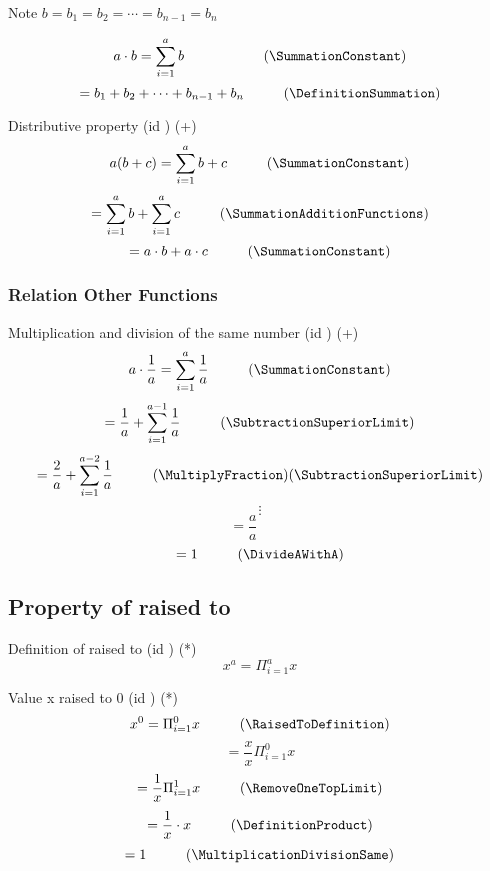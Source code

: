 \documentclass{book}
\begin{document}
                Note $b = b_1 = b_2 = \cdots = b_{n - 1} = b_n$
                
                \[a \cdot b = \sum^a_{i=1}b \hspace{1cm} \hspace{1cm} (\SummationConstant)\]
                \[= b_1 + b_2 + \cdots + b_{n - 1} + b_n \hspace{1cm} (\DefinitionSummation)\]

                Distributive property (id \DistributiveProperty) (+)
                \[a(b + c) = \sum^a_{i=1} b + c \hspace{1cm} (\SummationConstant)\]
                \[= \sum^a_{i=1} b + \sum^a_{i=1} c \hspace{1cm} (\SummationAdditionFunctions)\]
                \[= a \cdot b + a \cdot c \hspace{1cm} (\SummationConstant)\]

                \subsubsection{Relation Other Functions}
                Multiplication and division of the same number (id \MultiplicationDivisionSame) (+)
                \[a \cdot \frac{1}{a} = \sum^a_{i=1} \frac{1}{a} \hspace{1cm} (\SummationConstant)\]
                \[= \frac{1}{a} + \sum^{a - 1}_{i=1} \frac{1}{a} \hspace{1cm} (\SubtractionSuperiorLimit)\]
                \[= \frac{2}{a} + \sum^{a - 2}_{i=1} \frac{1}{a} \hspace{1cm} (\MultiplyFraction)(\SubtractionSuperiorLimit)\]
                \[\vdots\]
                \[= \frac{a}{a} \hspace{1cm}\]
                \[= 1 \hspace{1cm} (\DivideAWithA)\]

            \subsection{Property of raised to}
                Definition of raised to (id \RaisedToDefinition) (*)
                \[x^a = \Pi^a_{i = 1}x\]

                Value x raised to 0 (id \ValueXRaisedToZero) (*)
                \[x^0 = \Pi^0_{i = 1}x \hspace{1cm} (\RaisedToDefinition)\]
                \[= \frac{x}{x} \Pi^0_{i=1} x\]
                \[= \frac{1}{x} \Pi^1_{i=1}x \hspace{1cm} (\RemoveOneTopLimit)\]
                \[= \frac{1}{x} \cdot x  \hspace{1cm} (\DefinitionProduct)\]
                \[= 1 \hspace{1cm} (\MultiplicationDivisionSame)\]
\end{document}
